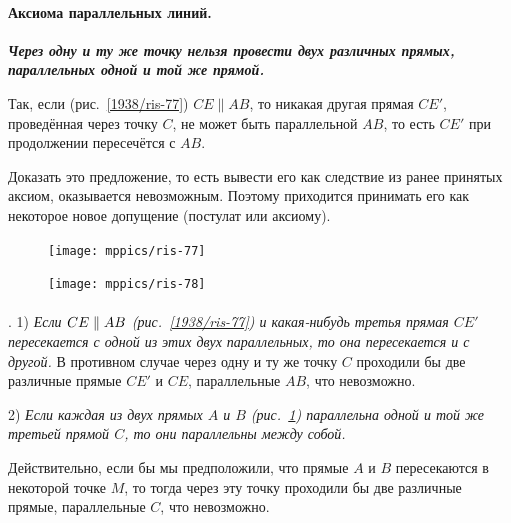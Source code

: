 \paragraph{Аксиома параллельных линий.}\label{1938/75}
\textbf{\emph{Через одну и ту же точку нельзя провести двух различных прямых, параллельных одной и той же прямой.}}

Так, если (рис.~\ref{1938/ris-77}) $CE\parallel AB$, то никакая другая прямая $CE'$, проведённая через точку $C$, не может быть параллельной $AB$, то есть $CE'$ при продолжении пересечётся с $AB$.

Доказать это предложение, то есть вывести его как следствие из ранее принятых аксиом, оказывается невозможным.
Поэтому приходится принимать его как некоторое новое допущение (постулат или аксиому).

\begin{figure}[h!]
\begin{minipage}{.48\textwidth}
\centering
\texttt{[image: mppics/ris-77]}
\end{minipage}\hfill
\begin{minipage}{.48\textwidth}
\centering
\texttt{[image: mppics/ris-78]}
\end{minipage}

\medskip

\begin{minipage}{.48\textwidth}
\centering
\caption{}\label{1938/ris-77}
\end{minipage}\hfill
\begin{minipage}{.48\textwidth}
\centering
\caption{}\label{1938/ris-78}
\end{minipage}
\vskip-4mm
\end{figure}

\paragraph{}\label{1938/76}
\mbox{.}
1) \emph{Если $CE\z\parallel AB$ \emph{(рис.~\ref{1938/ris-77})} и какая-нибудь третья прямая $CE'$ пересекается с одной из этих двух параллельных, то она пересекается и с другой.}
В противном случае через одну и ту же точку $C$ проходили бы две различные прямые $CE'$ и $CE$, параллельные $AB$, что невозможно.

2) \emph{Если каждая из двух прямых $A$ и $B$ \emph{(рис.~\ref{1938/ris-78})} параллельна одной и той же третьей прямой $C$, то они параллельны между собой.}

Действительно, если бы мы предположили, что прямые $A$ и $B$ пересекаются в некоторой точке $M$, то тогда через эту точку проходили бы две различные прямые, параллельные $C$, что невозможно.


